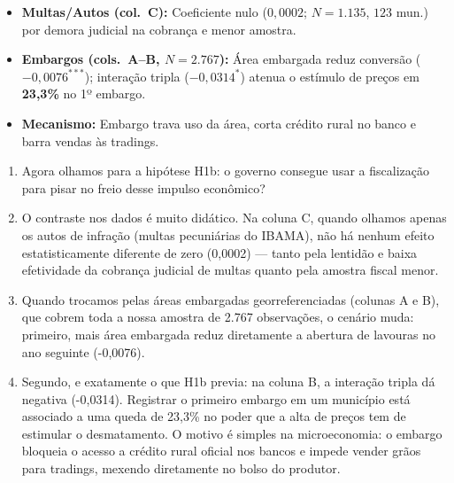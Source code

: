 \documentclass[11pt,a4paper]{article}
\begin{document}
\begin{tcolorbox}[title={\bfseries\small ÂNCORAS DO SLIDE}]
\begin{itemize}[leftmargin=*,itemsep=1mm,topsep=0.5mm]
    \item \textbf{Multas/Autos (col.\ C):} Coeficiente nulo ($0{,}0002$; $N=1.135$, $123$ mun.) por demora judicial na cobrança e menor amostra.
    \item \textbf{Embargos (cols.\ A--B, $N=2.767$):} Área embargada reduz conversão ($-0{,}0076^{***}$); interação tripla ($-0{,}0314^{*}$) atenua o estímulo de preços em \textbf{23,3\%} no 1º embargo.
    \item \textbf{Mecanismo:} Embargo trava uso da área, corta crédito rural no banco e barra vendas às tradings.
\end{itemize}
\end{tcolorbox}
\vspace{2mm}

\vspace{1mm}
\begin{enumerate}[leftmargin=*,label=\textbf{(\arabic*)},itemsep=2.6mm,topsep=1mm]
    \item Agora olhamos para a hipótese H1b: o governo consegue usar a fiscalização para pisar no freio desse impulso econômico?
    \item O contraste nos dados é muito didático. Na coluna C, quando olhamos apenas os autos de infração (multas pecuniárias do IBAMA), não há nenhum efeito estatisticamente diferente de zero (0,0002) — tanto pela lentidão e baixa efetividade da cobrança judicial de multas quanto pela amostra fiscal menor.
    \item Quando trocamos pelas áreas embargadas georreferenciadas (colunas A e B), que cobrem toda a nossa amostra de 2.767 observações, o cenário muda: primeiro, mais área embargada reduz diretamente a abertura de lavouras no ano seguinte (-0,0076).
    \item Segundo, e exatamente o que H1b previa: na coluna B, a interação tripla dá negativa (-0,0314). Registrar o primeiro embargo em um município está associado a uma queda de 23,3\% no poder que a alta de preços tem de estimular o desmatamento. O motivo é simples na microeconomia: o embargo bloqueia o acesso a crédito rural oficial nos bancos e impede vender grãos para tradings, mexendo diretamente no bolso do produtor.
\end{enumerate}
\end{document}
